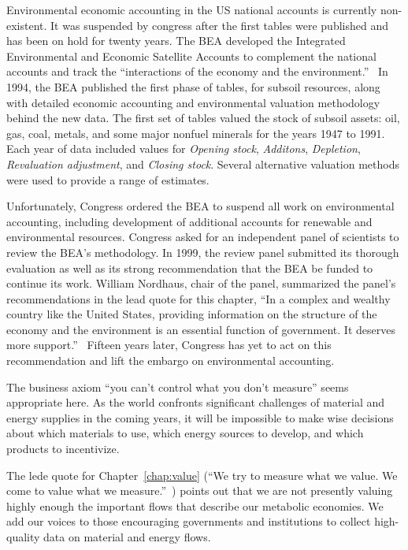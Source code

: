 Environmental economic accounting in the US national accounts is currently non-existent. 
It was suspended by congress after the first
tables were published and has been on hold for twenty years. 
The BEA developed the
Integrated Environmental and Economic Satellite Accounts 
to complement the national accounts and track the 
``interactions of the economy and the environment.''~\cite[p.~33]{BEA1994a} 
In 1994, the BEA published the first phase of tables, for subsoil resources, 
along with detailed economic accounting 
and environmental valuation methodology behind the new data.\cite{BEA1994a, BEA1994b} 
The first set of tables valued the stock of
subsoil assets: oil, gas, coal, metals, 
and some major nonfuel minerals for the years 1947 to 1991. Each
year of data included values for \emph{Opening stock}, 
\emph{Additons}, \emph{Depletion}, \emph{Revaluation adjustment}, 
and \emph{Closing stock}. 
Several alternative valuation methods were used to provide a range of estimates.

Unfortunately, Congress ordered the BEA
to suspend all work
on environmental accounting, including development of
additional accounts for renewable and environmental resources.  
Congress asked for an independent panel of scientists to review the 
BEA's methodology.
In 1999, the review panel submitted its thorough evaluation as well as its strong
recommendation that the BEA
be funded to continue its work.\cite{Nordhaus1999a}
William Nordhaus,
chair of the panel, summarized the panel's recommendations 
in the lead quote for this chapter, 
``In a complex and wealthy country like the United States, 
providing information on the structure of the economy and the environment 
is an essential function of government. 
It deserves more support.''~\cite[p.~49]{Nordhaus:1999aa}
Fifteen years later, Congress has yet to act on this recommendation 
and lift the embargo on environmental accounting.

The business axiom ``you can't control what you don't measure''
seems appropriate here. 
As the world confronts significant challenges
of material and energy supplies in the coming years,
it will be impossible to make wise decisions about
which materials to use,
which energy sources to develop, and 
which products to incentivize.

The lede quote for Chapter~\ref{chap:value}
(``We try to measure what we value. 
We come to value what we measure.''~\cite[p.~2]{Meadows:1998aa})
points out that we are not presently valuing highly enough
the important flows that describe our metabolic economies.
We add our voices to those encouraging governments and 
institutions to collect high-quality data on material 
and energy flows.


